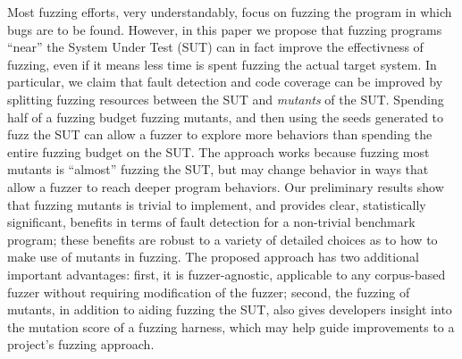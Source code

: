 Most fuzzing efforts, very understandably, focus on fuzzing the program
in which bugs are to be found.  However, in this paper we propose that
fuzzing programs ``near'' the System Under Test (SUT) can in fact
improve the effectivness of fuzzing, even if it means less time is
spent fuzzing the actual target system.  In particular, we claim that
fault detection and code coverage can be improved by splitting fuzzing
resources between the SUT and \emph{mutants} of the SUT.  Spending
half of a fuzzing budget fuzzing mutants, and then using the seeds
generated to fuzz the SUT can allow a fuzzer to explore more behaviors
than spending the entire fuzzing budget on the SUT.  The approach
works because fuzzing most mutants is ``almost'' fuzzing the SUT, but
may change behavior in ways that allow a fuzzer to reach deeper
program behaviors.  Our preliminary results show that fuzzing mutants
is trivial to implement, and provides clear, statistically significant, benefits in terms of fault
detection for a non-trivial benchmark program; these benefits are
robust to a variety of detailed choices as to how to make use of
mutants in fuzzing.  The proposed approach has two additional important advantages:
first, it is fuzzer-agnostic, applicable to any corpus-based fuzzer
without requiring modification of the fuzzer; second, the fuzzing of
mutants, in addition to aiding fuzzing the SUT, also gives developers
insight into the mutation score of a fuzzing harness, which may help
guide improvements to a project's fuzzing approach.
